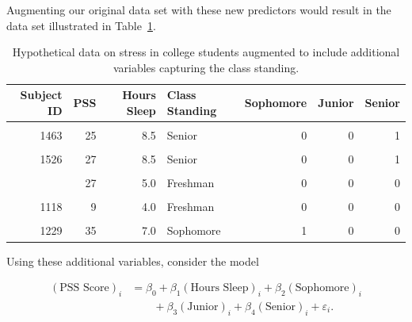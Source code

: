\documentclass[
  letterpaper,
  DIV=11,
  numbers=noendperiod]{scrreprt}
\theoremstyle{definition}
\theoremstyle{definition}
\theoremstyle{remark}
\begin{document}
Augmenting our original data set with these new predictors would result
in the data set illustrated in
Table~\ref{tbl-modeling-categorical-predictors-stress-data-aug}.

\hypertarget{tbl-modeling-categorical-predictors-stress-data-aug}{}
\begin{table}
\caption{\label{tbl-modeling-categorical-predictors-stress-data-aug}Hypothetical data on stress in college students augmented to include
additional variables capturing the class standing. }\tabularnewline

\centering
\begin{tabular}[t]{rrrlrrr}
\toprule
Subject ID & PSS & Hours Sleep & Class Standing & Sophomore & Junior & Senior\\
\midrule
\cellcolor{gray!6}{1415} & \cellcolor{gray!6}{14} & \cellcolor{gray!6}{7.5} & \cellcolor{gray!6}{Freshman} & \cellcolor{gray!6}{0} & \cellcolor{gray!6}{0} & \cellcolor{gray!6}{0}\\
1463 & 25 & 8.5 & Senior & 0 & 0 & 1\\
\cellcolor{gray!6}{1179} & \cellcolor{gray!6}{26} & \cellcolor{gray!6}{7.0} & \cellcolor{gray!6}{Junior} & \cellcolor{gray!6}{0} & \cellcolor{gray!6}{1} & \cellcolor{gray!6}{0}\\
1526 & 27 & 8.5 & Senior & 0 & 0 & 1\\
\cellcolor{gray!6}{1195} & \cellcolor{gray!6}{5} & \cellcolor{gray!6}{8.0} & \cellcolor{gray!6}{Sophomore} & \cellcolor{gray!6}{1} & \cellcolor{gray!6}{0} & \cellcolor{gray!6}{0}\\
\addlinespace
1938 & 27 & 5.0 & Freshman & 0 & 0 & 0\\
\cellcolor{gray!6}{1818} & \cellcolor{gray!6}{28} & \cellcolor{gray!6}{5.5} & \cellcolor{gray!6}{Junior} & \cellcolor{gray!6}{0} & \cellcolor{gray!6}{1} & \cellcolor{gray!6}{0}\\
1118 & 9 & 4.0 & Freshman & 0 & 0 & 0\\
\cellcolor{gray!6}{1299} & \cellcolor{gray!6}{29} & \cellcolor{gray!6}{9.0} & \cellcolor{gray!6}{Freshman} & \cellcolor{gray!6}{0} & \cellcolor{gray!6}{0} & \cellcolor{gray!6}{0}\\
1229 & 35 & 7.0 & Sophomore & 1 & 0 & 0\\
\bottomrule
\end{tabular}
\end{table}

Using these additional variables, consider the model

\[
\begin{aligned}
  (\text{PSS Score})_i &= \beta_0 + \beta_1 (\text{Hours Sleep})_i + \beta_2 (\text{Sophomore})_i \\
    &\qquad + \beta_3 (\text{Junior})_i + \beta_4 (\text{Senior})_i + \varepsilon_i.
\end{aligned}
\]
\end{document}
